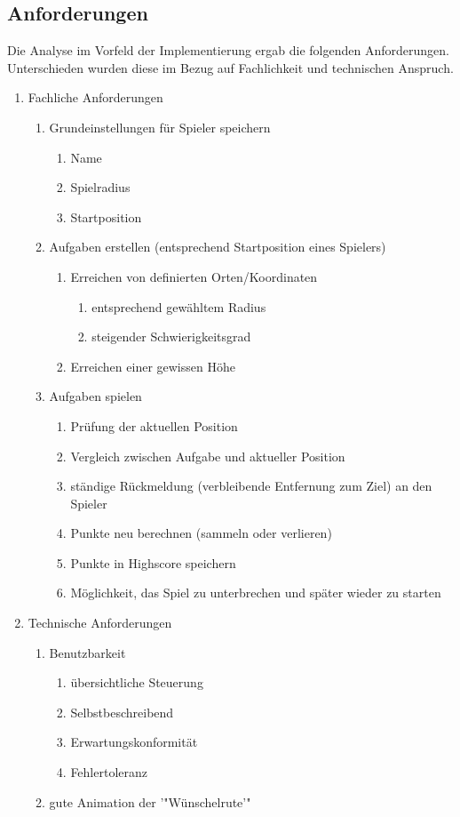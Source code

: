 \subsection{Anforderungen}
Die Analyse im Vorfeld der Implementierung ergab die folgenden Anforderungen. Unterschieden wurden diese im Bezug auf Fachlichkeit und technischen Anspruch.
\begin{enumerate}
\item Fachliche Anforderungen
	\begin{enumerate}
		\item Grundeinstellungen für Spieler speichern
		\begin{enumerate}
			\item Name
			\item Spielradius		
			\item Startposition
		\end{enumerate}
		\item Aufgaben erstellen (entsprechend Startposition eines Spielers)
		\begin{enumerate}
			\item Erreichen von definierten Orten/Koordinaten
			\begin{enumerate}
				\item entsprechend gewähltem Radius
				\item steigender Schwierigkeitsgrad
			\end{enumerate}
			\item Erreichen einer gewissen Höhe
		\end{enumerate}
		\item Aufgaben spielen
		\begin{enumerate}
			\item Prüfung der aktuellen Position 
			\item Vergleich zwischen Aufgabe und aktueller Position
			\item ständige Rückmeldung (verbleibende Entfernung zum Ziel) an den Spieler
			\item Punkte neu berechnen (sammeln oder verlieren)
			\item Punkte in Highscore speichern
			\item Möglichkeit, das Spiel zu unterbrechen und später wieder zu starten
		\end{enumerate}
	\end{enumerate}
	\item Technische Anforderungen
	\begin{enumerate}
		\item Benutzbarkeit
		\begin{enumerate}
			\item übersichtliche Steuerung
			\item Selbstbeschreibend
			\item Erwartungskonformität
			\item Fehlertoleranz
		\end{enumerate}
		\item gute Animation der '"Wünschelrute'"
	\end{enumerate}
\end{enumerate}
